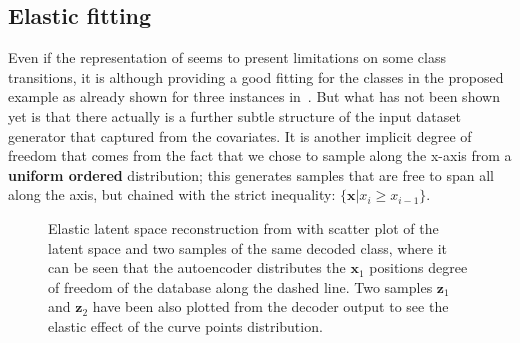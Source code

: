 \subsection{Elastic fitting}
Even if the representation of  seems to present limitations on some class transitions, it is although providing a good fitting for the classes in the proposed example as already shown for three instances in~\Figure{\ref{fig:step_1}}. But what has not been shown yet is that there actually is a further subtle structure of the input dataset generator that  captured from the covariates. It is another implicit degree of freedom that comes from the fact that we chose to sample along the x-axis from a \textbf{uniform ordered} distribution; this generates samples that are free to span all along the axis, but chained with the strict inequality: $\{\bm{x} | x_{i} \geqslant x_{i-1}\}$.
\begin{figure}
    \centering
    \caption{Elastic latent space reconstruction from  with scatter plot of the latent space and two samples of the same decoded class, where it can be seen that the autoencoder distributes the $\bm{x}_1$ positions degree of freedom of the database along the dashed line. Two samples $\bm{z}_1$ and $\bm{z}_2$ have been also plotted from the decoder output to see the elastic effect of the curve points distribution. } 
    \label{fig:step1_elastic}
\end{figure}
